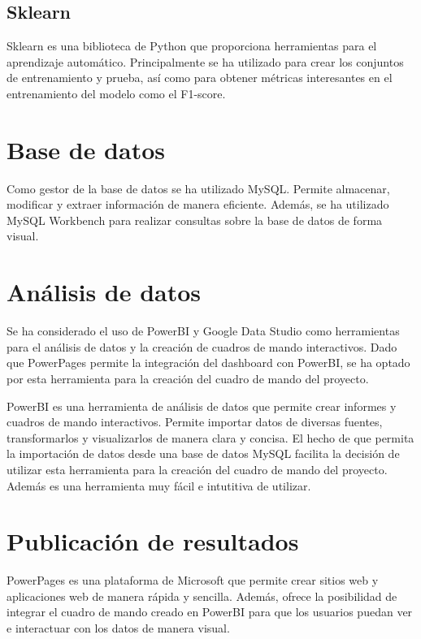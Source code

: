 \subsection{Sklearn}

Sklearn es una biblioteca de Python que proporciona herramientas para el aprendizaje automático.
Principalmente se ha utilizado para crear los conjuntos de entrenamiento y prueba, así como para obtener métricas interesantes en el entrenamiento del modelo como el F1-score.

\section{Base de datos}

Como gestor de la base de datos se ha utilizado MySQL. Permite almacenar, modificar y extraer información de manera eficiente.
Además, se ha utilizado MySQL Workbench para realizar consultas sobre la base de datos de forma visual.

\section{Análisis de datos}

Se ha considerado el uso de PowerBI y Google Data Studio como herramientas para el análisis de datos y la creación de cuadros de mando interactivos.
Dado que PowerPages permite la integración del dashboard con PowerBI, se ha optado por esta herramienta para la creación del cuadro de mando del proyecto.

PowerBI es una herramienta de análisis de datos que permite crear informes y cuadros de mando interactivos.
Permite importar datos de diversas fuentes, transformarlos y visualizarlos de manera clara y concisa.
El hecho de que permita la importación de datos desde una base de datos MySQL facilita la decisión de utilizar esta herramienta para la creación del cuadro de mando del proyecto.
Además es una herramienta muy fácil e intutitiva de utilizar.

\section{Publicación de resultados}

PowerPages es una plataforma de Microsoft que permite crear sitios web y aplicaciones web de manera rápida y sencilla.
Además, ofrece la posibilidad de integrar el cuadro de mando creado en PowerBI para que los usuarios puedan ver e interactuar con los datos de manera visual.

